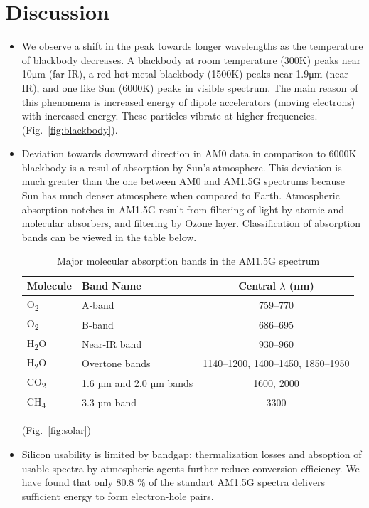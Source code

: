 \documentclass[11pt,a4paper]{article}
\begin{document}
\section{Discussion}
\begin{itemize}
  \item We observe a shift in the peak towards longer wavelengths as the temperature of blackbody decreases. A blackbody at room temperature (300K) peaks near 10μm (far IR), a red hot metal blackbody (1500K) peaks near 1.9μm (near IR), and one like Sun (6000K) peaks in visible spectrum. The main reason of this phenomena is increased energy of dipole accelerators (moving electrons) with increased energy. These particles vibrate at higher frequencies. (Fig.~\ref{fig:blackbody}).  
  \item Deviation towards downward direction in AM0 data in comparison to 6000K blackbody is a resul of absorption by Sun's atmosphere. This deviation is much greater  than the one between AM0 and AM1.5G spectrums because Sun has much denser atmosphere when compared to Earth. Atmospheric absorption notches in AM1.5G result from filtering of light by atomic and molecular absorbers, and filtering by Ozone layer. Classification of absorption bands can be viewed in the table below. 
  \begin{table}[htbp]
  \centering
  \caption{Major molecular absorption bands in the AM1.5G spectrum}
  \label{tab:atm_bands}
  \begin{tabular}{@{} l l c @{}}
    \hline
    Molecule          & Band Name           & Central $\lambda$ (nm)            \\ 
    \hline
    O\textsubscript{2} & A‐band              & 759--770                          \\
    O\textsubscript{2} & B‐band              & 686--695                          \\
    H\textsubscript{2}O & Near‐IR band        & 930--960                          \\
    H\textsubscript{2}O & Overtone bands      & 1140--1200, 1400--1450, 1850--1950\\
    CO\textsubscript{2} & 1.6 µm and 2.0 µm bands & 1600, 2000                  \\
    CH\textsubscript{4} & 3.3 µm band         & 3300                              \\ 
    \hline
  \end{tabular}
\end{table}
(Fig.~\ref{fig:solar})
  \item Silicon usability is limited by bandgap; thermalization losses and absoption of usable spectra by atmospheric agents further reduce conversion efficiency.  We have found that only 80.8 \% of the standart AM1.5G spectra delivers sufficient energy to form electron-hole pairs.
\end{itemize}
\end{document}
